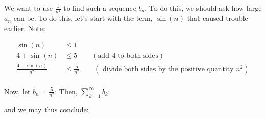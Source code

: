 \documentclass{ximera}
\begin{document}
\begin{exercise}
\begin{exercise}
\begin{exercise}
We want to use $\frac{1}{n^2}$ to find such a sequence $b_n$.  To do this, we should ask how large $a_n$ can be.  To do this, let's start with the term, $\sin(n)$ that caused trouble earlier.  Note:

\begin{align*}
\sin(n) &\leq 1 \\
4+\sin(n) & \leq 5  \qquad (\textrm{add } 4 \textrm{ to both sides}) \\
\frac{4+\sin(n)}{n^2} & \leq \frac{5}{n^2} \qquad (\textrm{ divide both sides by the positive quantity } n^2) \\
\end{align*}

Now, let $b_n = \frac{5}{n^2}$:  Then, $\sum_{k=1}^{\infty} b_k$:

\begin{multipleChoice}
\end{multipleChoice}

and we may thus conclude:
\begin{multipleChoice}
\end{multipleChoice}


\end{exercise}
\end{exercise}
\end{exercise}
\end{document}
